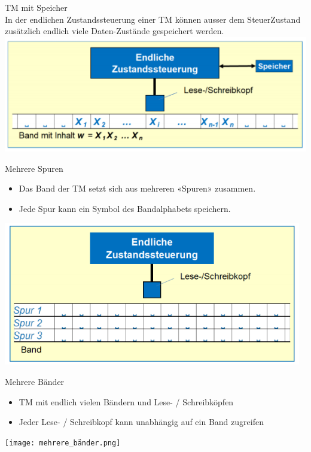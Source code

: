 \begin{concept}{TM mit Speicher}\\
    In der endlichen Zustandssteuerung einer TM können ausser dem SteuerZustand zusätzlich endlich viele Daten-Zustände gespeichert werden.\\
    \includegraphics[width=0.3\linewidth]{tm_mit_speicher.png}
\end{concept}

\begin{concept}{Mehrere Spuren}
    \begin{itemize}
        \item Das Band der TM setzt sich aus mehreren «Spuren» zusammen.
        \item Jede Spur kann ein Symbol des Bandalphabets speichern.
    \end{itemize}
    \includegraphics[width=0.3\linewidth]{mehrere_spuren.png}
\end{concept}

\begin{concept}{Mehrere Bänder}
    \begin{itemize}
        \item TM mit endlich vielen Bändern und Lese- / Schreibköpfen
        \item Jeder Lese- / Schreibkopf kann unabhängig auf ein Band zugreifen
    \end{itemize}
    \texttt{[image: mehrere\_bänder.png]}
\end{concept}

